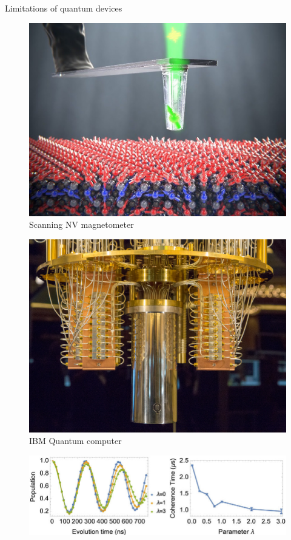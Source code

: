 \documentclass[12pt,c]{beamer}
\begin{document}
\begin{frame}{Limitations of quantum devices}
  \begin{multicols}{2}
    \begin{figure}[h]
      \centering
      \includegraphics[width=0.85\linewidth]{nv-probe}
      \caption{Scanning NV magnetometer}
    \end{figure}
    \vfill\null\columnbreak%
    \begin{figure}[h]
      \centering
      \includegraphics[width=0.85\linewidth]{ibm-q}
      \caption{IBM Quantum computer}
    \end{figure}
  \end{multicols}
  \begin{figure}[h]
    \centering
    \vspace{-2\baselineskip}
    \includegraphics[width=0.85\linewidth]{nv-coherence}
  \end{figure}
\end{frame}
\end{document}
